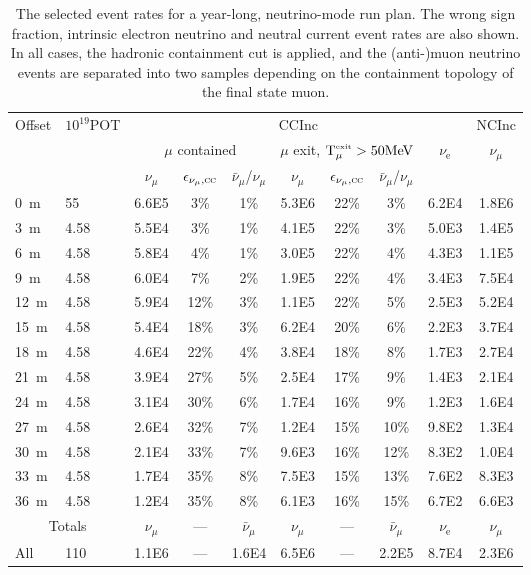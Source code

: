 \begin{table}
\begin{tabular}{ l l || c c | c || c c | c | c || c }
\multirow{3}{*}{Offset} & \multirow{3}{*}{$10^{19}$POT} & \multicolumn{7}{c||}{CCInc} & NCInc \\
\cline{3-10}
& & \multicolumn{3}{c||}{$\mu$ contained} & \multicolumn{3}{c|}{$\mu$ exit, $\textrm{T}_{\mu}^\textrm{\tiny exit} > 50 \textrm{MeV}$} & \multirow{2}{*}{$\nu_\textrm{e}$} & \multirow{2}{*}{$\nu_{\mu}$} \\
& & $\nu_{\mu}$ & $\epsilon_{\nu_{\mu},\textsc{cc}}$ & $\bar{\nu}_{\mu}$/$\nu_{\mu}$ & $\nu_{\mu}$ & $\epsilon_{\nu_{\mu},\textsc{cc}}$ & $\bar{\nu}_{\mu}$/$\nu_{\mu}$ & & \\ \hline
 0~m  &  55  & 6.6E5 & 3\% & 1\% & 5.3E6 & 22\% & 3\% & 6.2E4 & 1.8E6 \\
 3~m  &  4.58  & 5.5E4 & 3\% & 1\% & 4.1E5 & 22\% & 3\% & 5.0E3 & 1.4E5  \\
 6~m  &  4.58  & 5.8E4 & 4\% & 1\% & 3.0E5 & 22\% & 4\% & 4.3E3 & 1.1E5 \\
 9~m  &  4.58  & 6.0E4 & 7\% & 2\% & 1.9E5 & 22\% & 4\% & 3.4E3 & 7.5E4 \\
 12~m  &  4.58  & 5.9E4 & 12\% & 3\% & 1.1E5 & 22\% & 5\% & 2.5E3 & 5.2E4 \\
 15~m  &  4.58  & 5.4E4 & 18\% & 3\% & 6.2E4 & 20\% & 6\% & 2.2E3 & 3.7E4 \\
 18~m  &  4.58  & 4.6E4 & 22\% & 4\% & 3.8E4 & 18\% & 8\% & 1.7E3 & 2.7E4 \\
 21~m  &  4.58  & 3.9E4 & 27\% & 5\% & 2.5E4 & 17\% & 9\% & 1.4E3 & 2.1E4 \\
 24~m  &  4.58  & 3.1E4 & 30\% & 6\% & 1.7E4 & 16\% & 9\% & 1.2E3 & 1.6E4 \\
 27~m  &  4.58  & 2.6E4 & 32\% & 7\% & 1.2E4 & 15\% & 10\% & 9.8E2 & 1.3E4 \\
 30~m  &  4.58  & 2.1E4 & 33\% & 7\% & 9.6E3 & 16\% & 12\% & 8.3E2 & 1.0E4 \\
 33~m  &  4.58  & 1.7E4 & 35\% & 8\% & 7.5E3 & 15\% & 13\% & 7.6E2 & 8.3E3 \\
 36~m  &  4.58  & 1.2E4 & 35\% & 8\% & 6.1E3 & 16\% & 15\% & 6.7E2 & 6.6E3 \\
\hline
\hline
\multicolumn{2}{c||}{Totals} & $\nu_{\mu}$ & --- & $\bar{\nu}_{\mu}$ & $\nu_{\mu}$ & --- & $\bar{\nu}_{\mu}$ & $\nu_\textrm{e}$ & $\nu_{\mu}$ \\ \hline
 All  &  110  & 1.1E6 & --- & 1.6E4 & 6.5E6 & --- & 2.2E5 & 8.7E4 & 2.3E6 \\
\end{tabular}

\caption{The selected event rates for a year-long, neutrino-mode run plan. The wrong sign fraction, intrinsic electron neutrino and neutral current event rates are also shown. In all cases, the hadronic containment cut is applied, and the (anti-)muon neutrino events are separated into two samples depending on the containment topology of the final state muon.}
\label{table:evrates_LAR}
\end{table}

